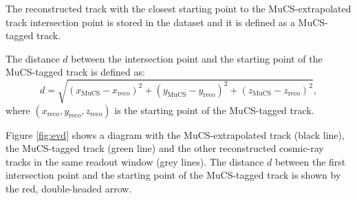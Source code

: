 \documentclass[a4paper,11pt]{article}
\begin{document}
The reconstructed track with the closest starting point to the MuCS-extrapolated track intersection point is stored in the dataset and it is defined as a MuCS-tagged track.

The distance $d$ between the intersection point and the starting point of the MuCS-tagged track is defined as:
\begin{equation}\label{eq:d}
d = \sqrt{(x_{\mathrm{MuCS}}-x_{\mathrm{reco}})^2+(y_{\mathrm{MuCS}}-y_{\mathrm{reco}})^2+(z_{\mathrm{MuCS}}-z_{\mathrm{reco}})^2},
\end{equation}
where $(x_{\mathrm{reco}},y_{\mathrm{reco}},z_{\mathrm{reco}})$ is the starting point of the MuCS-tagged track.

Figure \ref{fig:evd} shows a diagram with the MuCS-extrapolated track (black line), the MuCS-tagged track (green line) and the other reconstructed cosmic-ray tracks in the same readout window (grey lines). The distance $d$ between the first intersection point and the starting point of the MuCS-tagged track is shown by the red, double-headed arrow.
\end{document}

